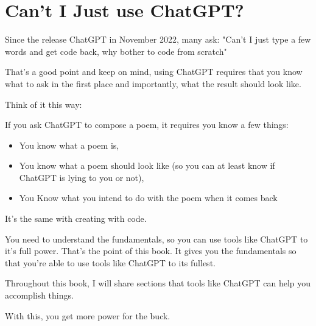 \section{Can't I Just use ChatGPT?}\label{sec:why-not-chatgpt?}

Since the release ChatGPT in November 2022, many ask: "Can't I just type a few words and get code back,
why bother to code from scratch"

That's a good point and keep on mind,
using ChatGPT requires that you know what to ask in the first place and importantly, what the result should look like.

Think of it this way:

If you ask ChatGPT to compose a poem, it requires you know a few things:

\begin{itemize}
    \item You know what a poem is,
    \item You know what a poem should look like (so you can at least know if ChatGPT is lying to you or not),
    \item You Know what you intend to do with the poem when it comes back
\end{itemize}

It's the same with creating with code.

You need to understand the fundamentals, so you can use tools like ChatGPT to it's full power.
That's the point of this book.
It gives you the fundamentals so that you're able to use tools like ChatGPT to its fullest.

Throughout this book, I will share sections that tools like ChatGPT can help you accomplish things.

With this, you get more power for the buck.


